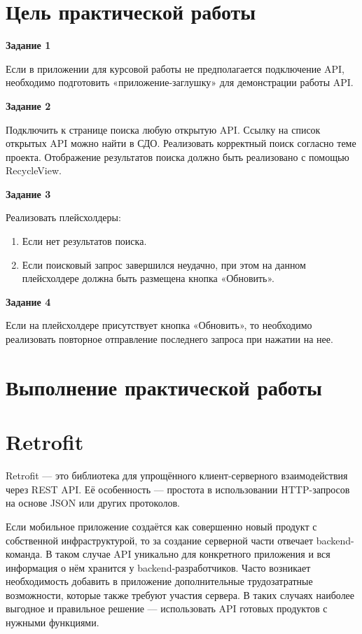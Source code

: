 \section*{\LARGE Цель практической работы}

\textbf{Задание 1}

Если в приложении для курсовой работы не предполагается подключение API,
необходимо подготовить «приложение-заглушку» для демонстрации работы
API.

\textbf{Задание 2}

Подключить к странице поиска любую открытую API. Ссылку на список
открытых API можно найти в СДО. Реализовать корректный поиск согласно
теме проекта. Отображение результатов поиска должно быть реализовано с
помощью RecycleView.

\textbf{Задание 3}

Реализовать плейсхолдеры:

\begin{enumerate}
	\item Если нет результатов поиска.
	\item Если поисковый запрос завершился неудачно, при этом на данном
		плейсхолдере должна быть размещена кнопка «Обновить».
\end{enumerate}

\textbf{Задание 4}

Если на плейсхолдере присутствует кнопка «Обновить», то необходимо
реализовать повторное отправление последнего запроса при нажатии на нее.

\clearpage

\section*{\LARGE Выполнение практической работы}

\section{Retrofit}

Retrofit — это библиотека для упрощённого клиент-серверного
взаимодействия через REST API. Её особенность --- простота в использовании
HTTP-запросов на основе JSON или других протоколов.\par
Если мобильное приложение создаётся как совершенно новый продукт с
собственной инфраструктурой, то за создание серверной части отвечает
backend-команда. В таком случае API уникально для конкретного приложения
и вся информация о нём хранится у backend-разработчиков. Часто возникает
необходимость добавить в приложение дополнительные трудозатратные
возможности, которые также требуют участия сервера. В таких случаях
наиболее выгодное и правильное решение --- использовать API готовых
продуктов с нужными функциями.\par

